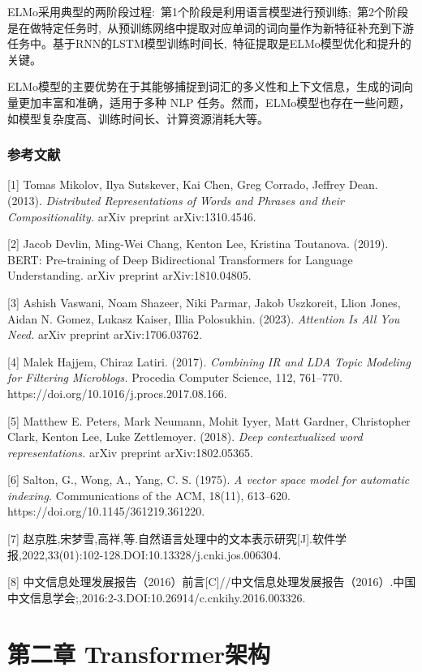 \documentclass[12pt,a4paper]{book}
\begin{document}
ELMo采用典型的两阶段过程:~第1个阶段是利用语言模型进行预训练;~第2个阶段是在做特定任务时,~从预训练网络中提取对应单词的词向量作为新特征补充到下游任务中。基于RNN的LSTM模型训练时间长,~特征提取是ELMo模型优化和提升的关键。

ELMo模型的主要优势在于其能够捕捉到词汇的多义性和上下文信息，生成的词向量更加丰富和准确，适用于多种
NLP
任务。然而，ELMo模型也存在一些问题，如模型复杂度高、训练时间长、计算资源消耗大等。

\subsection{参考文献}\label{ux53c2ux8003ux6587ux732e}

{[}1{]} Tomas Mikolov, Ilya Sutskever, Kai Chen, Greg Corrado, Jeffrey
Dean. (2013). \emph{Distributed Representations of Words and Phrases and
their Compositionality.} arXiv preprint arXiv:1310.4546.

{[}2{]} Jacob Devlin, Ming-Wei Chang, Kenton Lee, Kristina Toutanova.
(2019). BERT: Pre-training of Deep Bidirectional Transformers for
Language Understanding. arXiv preprint arXiv:1810.04805.

{[}3{]} Ashish Vaswani, Noam Shazeer, Niki Parmar, Jakob Uszkoreit,
Llion Jones, Aidan N. Gomez, Lukasz Kaiser, Illia Polosukhin. (2023).
\emph{Attention Is All You Need.} arXiv preprint arXiv:1706.03762.

{[}4{]} Malek Hajjem, Chiraz Latiri. (2017). \emph{Combining IR and LDA
Topic Modeling for Filtering Microblogs.} Procedia Computer Science,
112, 761--770. https://doi.org/10.1016/j.procs.2017.08.166.

{[}5{]} Matthew E. Peters, Mark Neumann, Mohit Iyyer, Matt Gardner,
Christopher Clark, Kenton Lee, Luke Zettlemoyer. (2018). \emph{Deep
contextualized word representations.} arXiv preprint arXiv:1802.05365.

{[}6{]} Salton, G., Wong, A., Yang, C. S. (1975). \emph{A vector space
model for automatic indexing.} Communications of the ACM, 18(11),
613--620. https://doi.org/10.1145/361219.361220.

{[}7{]}
赵京胜,宋梦雪,高祥,等.自然语言处理中的文本表示研究{[}J{]}.软件学报,2022,33(01):102-128.DOI:10.13328/j.cnki.jos.006304.

{[}8{]}
中文信息处理发展报告（2016）前言{[}C{]}//中文信息处理发展报告（2016）.中国中文信息学会;,2016:2-3.DOI:10.26914/c.cnkihy.2016.003326.

\chapter{第二章 Transformer架构}
{
\setcounter{tocdepth}{3}
\tableofcontents
}
\end{document}
